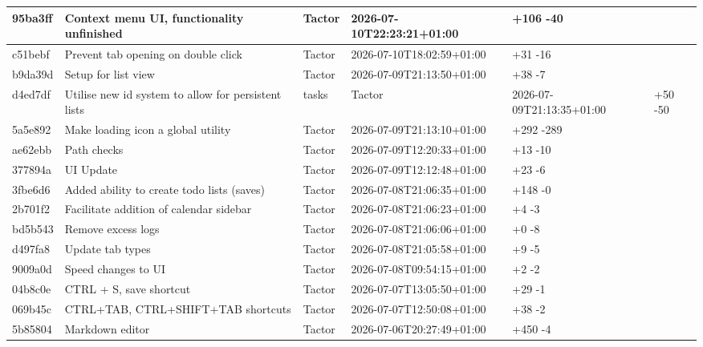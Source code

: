 \documentclass[11pt,a4paper]{full-example-report}
\begin{document}
\begin{table}[h]
\begin{tabularx}{\textwidth}{lllll}
95ba3ff & Context menu UI, functionality unfinished & Tactor & 2026-07-10T22:23:21+01:00 & \textcolor{insertion}{+106} \textcolor{deletion}{-40} \\ \hline
c51bebf & Prevent tab opening on double click & Tactor & 2026-07-10T18:02:59+01:00 & \textcolor{insertion}{+31} \textcolor{deletion}{-16} \\ \hline
b9da39d & Setup for list view & Tactor & 2026-07-09T21:13:50+01:00 & \textcolor{insertion}{+38} \textcolor{deletion}{-7} \\ \hline
d4ed7df & Utilise new id system to allow for persistent lists & tasks & Tactor & 2026-07-09T21:13:35+01:00 & \textcolor{insertion}{+50} \textcolor{deletion}{-50} \\ \hline
5a5e892 & Make loading icon a global utility & Tactor & 2026-07-09T21:13:10+01:00 & \textcolor{insertion}{+292} \textcolor{deletion}{-289} \\ \hline
ae62ebb & Path checks & Tactor & 2026-07-09T12:20:33+01:00 & \textcolor{insertion}{+13} \textcolor{deletion}{-10} \\ \hline
377894a & UI Update & Tactor & 2026-07-09T12:12:48+01:00 & \textcolor{insertion}{+23} \textcolor{deletion}{-6} \\ \hline
3fbe6d6 & Added ability to create todo lists (saves) & Tactor & 2026-07-08T21:06:35+01:00 & \textcolor{insertion}{+148} \textcolor{deletion}{-0} \\ \hline
2b701f2 & Facilitate addition of calendar sidebar & Tactor & 2026-07-08T21:06:23+01:00 & \textcolor{insertion}{+4} \textcolor{deletion}{-3} \\ \hline
bd5b543 & Remove excess logs & Tactor & 2026-07-08T21:06:06+01:00 & \textcolor{insertion}{+0} \textcolor{deletion}{-8} \\ \hline
d497fa8 & Update tab types & Tactor & 2026-07-08T21:05:58+01:00 & \textcolor{insertion}{+9} \textcolor{deletion}{-5} \\ \hline
9009a0d & Speed changes to UI & Tactor & 2026-07-08T09:54:15+01:00 & \textcolor{insertion}{+2} \textcolor{deletion}{-2} \\ \hline
04b8c0e & CTRL + S, save shortcut & Tactor & 2026-07-07T13:05:50+01:00 & \textcolor{insertion}{+29} \textcolor{deletion}{-1} \\ \hline
069b45c & CTRL+TAB, CTRL+SHIFT+TAB shortcuts & Tactor & 2026-07-07T12:50:08+01:00 & \textcolor{insertion}{+38} \textcolor{deletion}{-2} \\ \hline
5b85804 & Markdown editor & Tactor & 2026-07-06T20:27:49+01:00 & \textcolor{insertion}{+450} \textcolor{deletion}{-4} \\ \hline

\end{tabularx}
\end{table}
\end{document}

